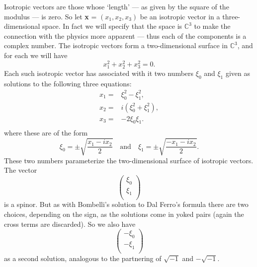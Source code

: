 \documentclass[11pt,oneside,a4paper]{article}
\newcommand{\isqrtwo}[2]{\hspace{0.4ex}\textit{#1}\ensuremath{\sqrt{#2}}\hspace{0.5ex}\xspace}
\begin{document}
Isotropic vectors are those whose `length' --- as given by the square of the modulus --- is zero. So let \textbf{x} = $(x_{1}, x_{2}, x_{3})$ be an isotropic vector in a three-dimensional space. In fact we will specify that the space is $\mathbb{C}^{3}$ to make the connection with the physics more apparent --- thus each of the components is a complex number. The isotropic vectors form a two-dimensional surface in $\mathbb{C}^{3}$, and for each we will have $$x_{1}^{2} + x_{2}^{2} + x_{3}^{2} = 0.$$ Each such isotropic vector has associated with it two numbers $\xi_{0}$ and $\xi_{1}$ given as solutions to the following three equations: \[  \begin{array}{cc}
x_{1} = & \xi_{0}^{2} - \xi_{1}^{2},   \\[2.0mm]
x_{2} =  & i(\xi_{0}^{2} + \xi_{1}^{2}), \\[2.0mm]
x_{3} =  & -2 \xi_{0} \xi_{1}. \\
 \end{array} \] 
where these are of the form $$\xi_{0} = \pm \sqrt{\frac{x_{1} - ix_{2}}{2}}\quad \mbox{and}\quad  \xi_{1} = \pm \sqrt{\frac{- x_{1} - ix_{2}}{2}}.$$ These two numbers parameterize the two-dimensional surface of isotropic vectors. The vector  \[ \left( \begin{array}{c}
\xi_{0} \\
\xi_{1} \\ \end{array} \right)\] 
is a spinor. But as with Bombelli's solution to Dal Ferro's formula there are two choices, depending on the sign, as the solutions come in yoked pairs (again the cross terms are discarded). So we also have
\[ \left( \begin{array}{c}
- \xi_{0} \\
- \xi_{1} \\ \end{array} \right)\] as a second solution, analogous to the partnering of \isqrtwo{}{-1} and \isqrtwo{$-$}{-1}.
\end{document}
